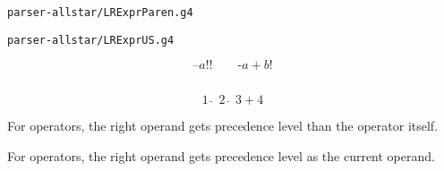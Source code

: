 \begin{frame}{}
  \begin{center}
    \texttt{parser-allstar/LRExprParen.g4}

    \vspace{0.30cm}
  \end{center}
\end{frame}

\begin{frame}{}
  \begin{center}
    \texttt{parser-allstar/LRExprUS.g4}

    \vspace{0.30cm}
  \end{center}
\end{frame}

\begin{frame}{}
  \begin{center}
  \end{center}

  \[
    \text{--}a!! \qquad \text{-}a+b!
  \]
\end{frame}

\begin{frame}{}
  \begin{columns}
      \pause
  \end{columns}

  \vspace{0.80cm}
  \[
    1 \;\hat{\;}\; 2 \;\hat{\;}\; 3 + 4
  \]
\end{frame}

\begin{frame}{}
  \begin{center}
    For  operators, the right operand
    gets  precedence level than the operator itself.
  \end{center}

  \vspace{0.30cm}
  \begin{center}
  \end{center}

  \vspace{0.10cm}
  \begin{center}
    For  operators, the right operand
    gets  precedence level as the current operand.
  \end{center}
\end{frame}
